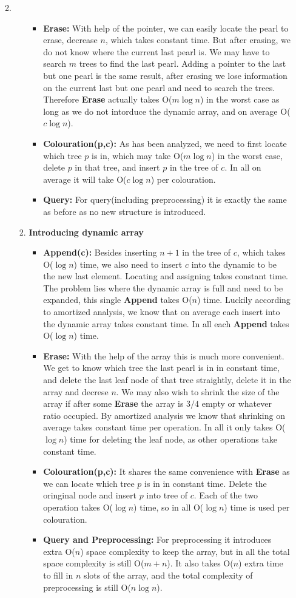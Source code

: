 \documentclass[12pt,a4paper]{article}
\makeatletter
\newtheorem*{solution}{Solution}
\theoremstyle{definition}
\renewenvironment{solution}[1][Solution] {\par\pushQED{\qed}\normalfont\topsep6\p@\@plus6\p@\relax\trivlist\item[\hskip\labelsep\bfseries#1\@addpunct{.}]\ignorespaces}{\popQED\endtrivlist\@endpefalse} \makeatother
\makeatother
\begin{document}
\begin{enumerate}
\begin{enumerate}
\begin{solution}
\begin{enumerate}
\begin{itemize}
      \item \textbf{Erase:} With help of the pointer, we can easily locate the pearl to erase, decrease $n$, which takes constant time. But after erasing, we do not know where the current last pearl is. We may have to  search $m$ trees to find the last pearl. Adding a pointer to the last but one pearl is the same result, after erasing we lose information on the current last but one pearl and need to search the trees. Therefore \textbf{Erase} actually takes O($m\log n$) in the worst case as long as we do not intorduce the dynamic array, and on average O($c\log n$).
      \item \textbf{Colouration(p,c):} As has been analyzed, we need to first locate which tree $p$ is in, which may take O($m\log n$) in the worst case, delete $p$ in that tree, and insert $p$ in the tree of $c$. In all on average it will take O($c\log n$) per colouration.
      \item \textbf{Query:} For query(including preprocessing) it is exactly the same as before as no new structure is introduced.
    \end{itemize}
    \item \textbf{Introducing dynamic array}
    \begin{itemize}
      \item \textbf{Append(c):} Besides inserting $n+1$ in the tree of $c$, which takes O($\log n$) time, we also need to insert $c$ into the dynamic to be the new last element. Locating and assigning takes constant time. The problem lies where the dynamic array is full and need to be expanded, this single \textbf{Append} takes O($n$) time. Luckily according to amortized analysis, we know that on average each insert into the dynamic array takes constant time. In all each \textbf{Append} takes O($\log n$) time.
      \item \textbf{Erase:} With the help of the array this is much more convenient. We get to know which tree the last pearl is in in constant time, and delete the last leaf node of that tree straightly, delete it in the array and decrese $n$. We may also wish to shrink the size of the array if after some \textbf{Erase} the array is $3/4$ empty or whatever ratio occupied. By amortized analysis we know that shrinking on average takes constant time per operation. In all it only takes O($\log n$) time for deleting the leaf node, as other operations take constant time.
      \item \textbf{Colouration(p,c):} It shares the same convenience with \textbf{Erase} as we can locate which tree $p$ is in in constant time. Delete the oringinal node and insert $p$ into tree of $c$. Each of the two operation takes O($\log n$) time, so in all O($\log n$) time is used per colouration.
      \item \textbf{Query and Preprocessing:} For preprocessing it introduces extra O($n$) space complexity to keep the array, but in all the total space complexity is still O($m+n$). It also takes O($n$) extra time to fill in $n$ slots of the array, and the total complexity of preprocessing is still O($n\log n$).
      

\end{itemize}
\end{enumerate}
\end{solution}
\end{enumerate}
\end{enumerate}
\end{document}

